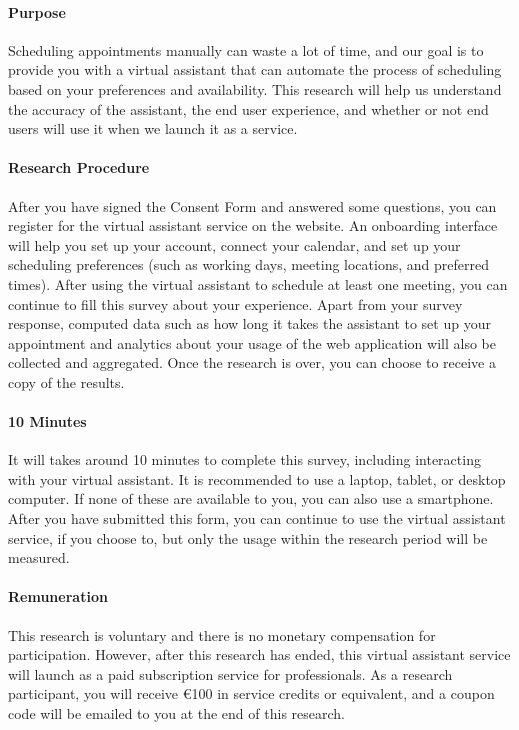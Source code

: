 \documentclass{article}
\begin{document}
\paragraph{Purpose}

Scheduling appointments manually can waste a lot of time, and our goal is to provide you with a virtual assistant that can automate the process of scheduling based on your preferences and availability. This research will help us understand the accuracy of the assistant, the end user experience, and whether or not end users will use it when we launch it as a service.

\paragraph{Research Procedure}

After you have signed the Consent Form and answered some questions, you can register for the virtual assistant service on the website. An onboarding interface will help you set up your account, connect your calendar, and set up your scheduling preferences (such as working days, meeting locations, and preferred times). After using the virtual assistant to schedule at least one meeting, you can continue to fill this survey about your experience. Apart from your survey response, computed data such as how long it takes the assistant to set up your appointment and analytics about your usage of the web application will also be collected and aggregated. Once the research is over, you can choose to receive a copy of the results.

\paragraph{10 Minutes}

It will takes around 10 minutes to complete this survey, including interacting with your virtual assistant. It is recommended to use a laptop, tablet, or desktop computer. If none of these are available to you, you can also use a smartphone. After you have submitted this form, you can continue to use the virtual assistant service, if you choose to, but only the usage within the research period will be measured.

\paragraph{Remuneration}

This research is voluntary and there is no monetary compensation for participation. However, after this research has ended, this virtual assistant service will launch as a paid subscription service for professionals. As a research participant, you will receive €100 in service credits or equivalent, and a coupon code will be emailed to you at the end of this research.
\end{document}

